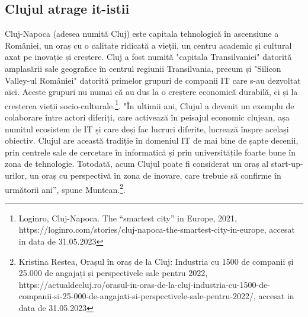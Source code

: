 \documentclass[a4paper, 12pt]{article}
\begin{document}
	\subsection{Clujul atrage it-istii}
	\quad\quad\space Cluj-Napoca (adesea numită Cluj) este capitala tehnologică în ascensiune a României, un oraș cu o calitate ridicată a vieții, un centru academic și cultural axat pe inovație și creștere. Cluj a fost numită "capitala Transilvaniei" datorită amplasării sale geografice în centrul regiunii Transilvania, precum și "Silicon Valley-ul României" datorită primelor grupuri de companii IT care s-au dezvoltat aici. Aceste grupuri nu numai că au dus la o creștere economică durabilă, ci și la creșterea vieții socio-culturale.\footnote{Loginro, Cluj-Napoca. The “smartest city” in Europe, 2021, https://loginro.com/stories/cluj-napoca-the-smartest-city-in-europe, accesat in data de 31.05.2023}. "În ultimii ani, Clujul a devenit un exemplu de colaborare între actori diferiți, care activează în peisajul economic clujean, așa numitul ecosistem de IT și care deși fac lucruri diferite, lucrează înspre același obiectiv. Clujul are această tradiție în domeniul IT de mai bine de șapte decenii, prin centrele sale de cercetare în informatică și prin universitățile foarte bune în zona de tehnologie. Totodată, acum Clujul poate fi considerat un oraș al start-up-urilor, un oraș cu perspectivă în zona de inovare, care trebuie să confirme în următorii ani”, spune Muntean.\footnote{Kristina Restea, Orașul în oraș de la Cluj: Industria cu 1500 de companii și 25.000 de angajați și perspectivele sale pentru 2022, https://actualdecluj.ro/orasul-in-oras-de-la-cluj-industria-cu-1500-de-companii-si-25-000-de-angajati-si-perspectivele-sale-pentru-2022/, accesat in data de 31.05.2023}. 



\end{document}
